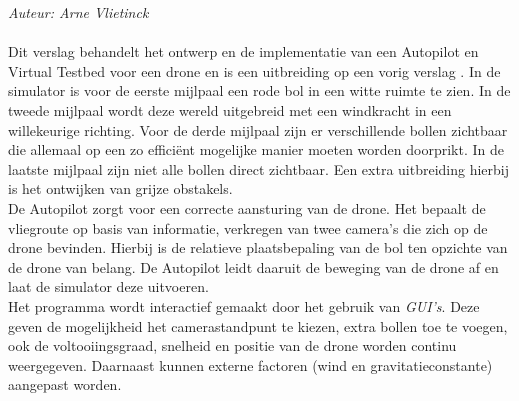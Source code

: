 \noindent
{\em Auteur: Arne Vlietinck}\\
\\
Dit verslag behandelt het ontwerp en de implementatie van een Autopilot en Virtual Testbed voor een drone en is een uitbreiding op een vorig verslag \cite{arcticle:tssnTijds}. In de simulator is voor de eerste mijlpaal een rode bol in een witte ruimte te zien. In de tweede mijlpaal wordt deze wereld uitgebreid met een windkracht in een willekeurige richting. Voor de derde mijlpaal zijn er verschillende bollen zichtbaar die allemaal op een zo efficiënt mogelijke manier moeten worden doorprikt. In de laatste mijlpaal zijn niet alle bollen direct zichtbaar. Een extra uitbreiding hierbij is het ontwijken van grijze obstakels.
\\
De Autopilot zorgt voor een correcte aansturing van de drone. Het bepaalt de vliegroute op basis van informatie, verkregen van twee camera's die zich op de drone bevinden. Hierbij is de relatieve plaatsbepaling van de bol ten opzichte van de drone van belang. De Autopilot leidt daaruit de beweging van de drone af en laat de simulator deze uitvoeren.
\\
Het programma wordt interactief gemaakt door het gebruik van \textit{GUI's}. Deze geven de mogelijkheid het camerastandpunt te kiezen, extra bollen toe te voegen, ook de voltooiingsgraad, snelheid en positie van de drone worden continu weergegeven. Daarnaast kunnen externe factoren (wind en gravitatieconstante) aangepast worden.